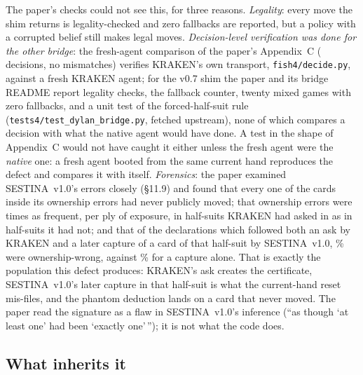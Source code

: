 \documentclass[11pt]{article}
\newcommand{\code}[1]{\texttt{#1}}
\newcommand{\sestina}{\mbox{SESTINA v1.0}}
\newcommand{\pct}{\%}
\begin{document}
The paper's checks could not see this, for three reasons. \emph{Legality}: every move the shim
returns is legality-checked and zero fallbacks are reported, but a policy with a corrupted belief
still makes legal moves. \emph{Decision-level verification was done for the other bridge}: the
fresh-agent comparison of the paper's Appendix~C (\kcPaperShimDecisions{} decisions, no mismatches)
verifies KRAKEN's own transport, \code{fish4/decide.py}, against a fresh KRAKEN agent; for the v0.7
shim the paper and its bridge README report legality checks, the fallback counter, twenty mixed games
with zero fallbacks, and a unit test of the forced-half-suit rule (\code{tests4/test\_dylan\_bridge.py},
fetched upstream), none of which compares a decision with what the native agent would have done. A
test in the shape of Appendix~C would not have caught it either unless the fresh agent were the
\emph{native} one: a fresh agent booted from the same current hand reproduces the defect and compares
it with itself. \emph{Forensics}: the paper examined \sestina{}'s errors closely (\S11.9) and found
that every one of the \kcPaperNeverMoved{} cards inside its ownership errors had never publicly moved;
that ownership errors were \kcPaperRateRatio{} times as frequent, per ply of exposure, in half-suits
KRAKEN had asked in as in half-suits it had not; and that of the declarations which followed both an
ask by KRAKEN and a later capture of a card of that half-suit by \sestina{},
\kcPaperFollowedBothPct\pct{} were ownership-wrong, against \kcPaperFollowedTakingPct\pct{} for a
capture alone. That is exactly the population this defect produces: KRAKEN's ask creates the
certificate, \sestina{}'s later capture in that half-suit is what the current-hand reset mis-files, and
the phantom deduction lands on a card that never moved. The paper read the signature as a flaw in
\sestina{}'s inference (``as though `at least one' had been `exactly one'\,''); it is not what the code
does.

\subsection{What inherits it}
\end{document}
